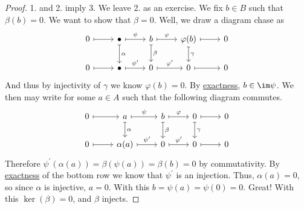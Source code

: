 \begin{proof}
	1. and 2. imply 3. We leave 2. as an exercise. We fix \(b \in B\) such that \(\beta(b) = 0\). We want to show that \(\beta = 0\). Well, we draw a diagram chase as
	\[\begin{tikzcd}
			0 & {\bullet } & b & {\varphi(b)} & 0 \\
			0 & {\bullet } & 0 & 0 & 0
			\arrow[maps to, from=1-1, to=1-2]
			\arrow["\psi", maps to, from=1-2, to=1-3]
			\arrow["\varphi", maps to, from=1-3, to=1-4]
			\arrow[maps to, from=1-4, to=1-5]
			\arrow["\gamma", maps to, from=1-4, to=2-4]
			\arrow[maps to, from=2-4, to=2-5]
			\arrow["{\varphi^\prime}", maps to, from=2-3, to=2-4]
			\arrow["\beta", maps to, from=1-3, to=2-3]
			\arrow["{\psi^\prime}", maps to, from=2-2, to=2-3]
			\arrow["\alpha", maps to, from=1-2, to=2-2]
			\arrow[maps to, from=2-1, to=2-2]
		\end{tikzcd}\]
	And thus by injectivity of $\gamma$ we know $\varphi(b) = 0$. By \hyperref[def:exact]{exactness}, $b \in \im \psi$. We then may write for some $a \in A$ such that the following
	diagram commutes.
	\[\begin{tikzcd}
			0 & a & b & 0 & 0 \\
			0 & {\alpha(a)} & 0 & 0 & 0
			\arrow[maps to, from=1-1, to=1-2]
			\arrow["\varphi", maps to, from=1-3, to=1-4]
			\arrow[maps to, from=1-4, to=1-5]
			\arrow["\gamma", maps to, from=1-4, to=2-4]
			\arrow[maps to, from=2-4, to=2-5]
			\arrow["{\varphi^\prime}", maps to, from=2-3, to=2-4]
			\arrow["\beta", maps to, from=1-3, to=2-3]
			\arrow["{\psi^\prime}", maps to, from=2-2, to=2-3]
			\arrow["\alpha", maps to, from=1-2, to=2-2]
			\arrow[maps to, from=2-1, to=2-2]
			\arrow["\psi", maps to, from=1-2, to=1-3]
		\end{tikzcd}\]
	Therefore $\psi^\prime (\alpha(a)) = \beta(\psi(a)) = \beta(b) = 0$ by commutativity. By \hyperref[def:exact]{exactness} of the bottom row we know that $\psi^\prime $ is an injection.
	Thus, $\alpha(a) = 0$, so since $\alpha$ is injective, $a = 0$. With this $b = \psi(a) = \psi(0) = 0$. Great! With this $\ker(\beta) = 0$, and $\beta$ injects.
\end{proof}